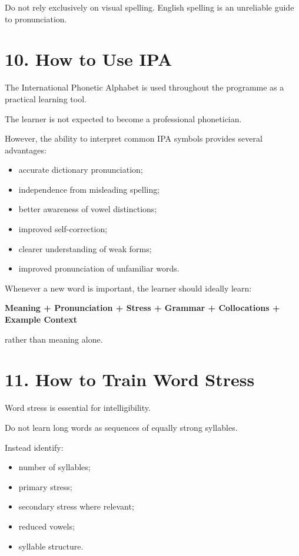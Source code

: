 Do not rely exclusively on visual spelling. English spelling is an unreliable guide to pronunciation.

\section*{10. How to Use IPA}

The International Phonetic Alphabet is used throughout the programme as a practical learning tool.

The learner is not expected to become a professional phonetician.

However, the ability to interpret common IPA symbols provides several advantages:

\begin{itemize}
    \item accurate dictionary pronunciation;
    \item independence from misleading spelling;
    \item better awareness of vowel distinctions;
    \item improved self-correction;
    \item clearer understanding of weak forms;
    \item improved pronunciation of unfamiliar words.
\end{itemize}

Whenever a new word is important, the learner should ideally learn:

\begin{center}
\textbf{Meaning + Pronunciation + Stress + Grammar + Collocations + Example Context}
\end{center}

rather than meaning alone.

\section*{11. How to Train Word Stress}

Word stress is essential for intelligibility.

Do not learn long words as sequences of equally strong syllables.

Instead identify:

\begin{itemize}
    \item number of syllables;
    \item primary stress;
    \item secondary stress where relevant;
    \item reduced vowels;
    \item syllable structure.
\end{itemize}

